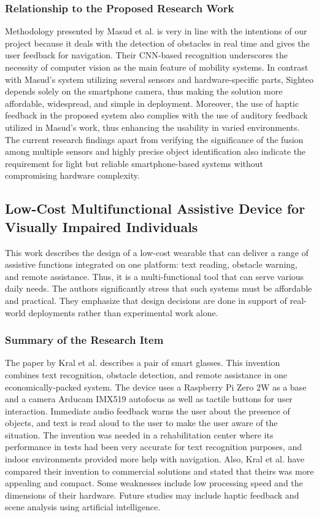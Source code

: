 \documentclass{FastFyp}
\begin{document}
\subsubsection{Relationship to the Proposed Research Work}

Methodology presented by Masud et al. \cite{ref:masud2022smart} is very in line with the intentions of our project because it deals with the detection of obstacles in real time and gives the user feedback for navigation. Their CNN-based recognition underscores the necessity of computer vision as the main feature of mobility systems. In contrast with Masud's system utilizing several sensors and hardware-specific parts, Sighteo depends solely on the smartphone camera, thus making the solution more affordable, widespread, and simple in deployment. Moreover, the use of haptic feedback in the proposed system also complies with the use of auditory feedback utilized in Masud's work, thus enhancing the usability in varied environments. The current research findings apart from verifying the significance of the fusion among multiple sensors and highly precise object identification also indicate the requirement for light but reliable smartphone-based systems without compromising hardware complexity.


\subsection{Low-Cost Multifunctional Assistive Device for Visually Impaired Individuals}
This work describes the design of a low-cost wearable that can deliver a range of assistive functions integrated on one platform: text reading, obstacle warning, and remote assistance. Thus, it is a multi-functional tool that can serve various daily needs. The authors significantly stress that such systems must be affordable and practical. They emphasize that design decisions are done in support of real-world deployments rather than experimental work alone.

\subsubsection{Summary of the Research Item}
The paper by Kral et al. \cite{ref:kral2025low} describes a pair of smart glasses. This invention combines text recognition, obstacle detection, and remote assistance in one economically-packed system. The device uses a Raspberry Pi Zero 2W as a base and a camera Arducam IMX519 autofocus as well as tactile buttons for user interaction. Immediate audio feedback warns the user about the presence of objects, and text is read aloud to the user to make the user aware of the situation. The invention was needed in a rehabilitation center where its performance in tests had been very accurate for text recognition purposes, and indoor environments provided more help with navigation. Also, Kral et al. have compared their invention to commercial solutions and stated that theirs was more appealing and compact. Some weaknesses include low processing speed and the dimensions of their hardware. Future studies may include haptic feedback and scene analysis using artificial intelligence.
\end{document}
